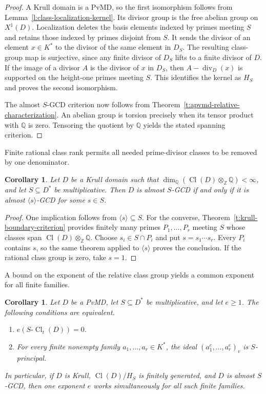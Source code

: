\documentclass[11pt]{amsart}
\newtheorem{corollary}[theorem]{Corollary}
\theoremstyle{definition}
\theoremstyle{remark}
\DeclareMathOperator{\Cl}{Cl}
\newcommand{\ZZ}{\mathbb Z}
\newcommand{\QQ}{\mathbb Q}
\begin{document}
\begin{proof}
A Krull domain is a PvMD, so the first isomorphism follows from
Lemma~\ref{l:class-localization-kernel}. Its divisor group is the
free abelian group on $X^1(D)$. Localization deletes the basis
elements indexed by primes meeting $S$ and retains those indexed
by primes disjoint from $S$. It sends the divisor of an element
$x\in K^\ast$ to the divisor of the same element in $D_S$.
The resulting class-group map is surjective, since any finite
divisor of $D_S$ lifts to a finite divisor of $D$.
If the image of a divisor $A$ is the divisor of $x$ in $D_S$,
then $A-\operatorname{div}_D(x)$ is supported on the height-one
primes meeting $S$. This identifies the kernel as $H_S$ and
proves the second isomorphism.

The almost $S$-GCD criterion now follows from
Theorem~\ref{t:apvmd-relative-characterization}.
An abelian group is torsion precisely when its tensor product
with $\QQ$ is zero. Tensoring the quotient by $\QQ$ yields the
stated spanning criterion.
\end{proof}

Finite rational class rank permits all needed prime-divisor classes
to be removed by one denominator.

\begin{corollary}\label{c:one-denominator-finite-rank}
Let $D$ be a Krull domain such that
$\dim_{\QQ}(\Cl(D)\otimes_{\ZZ}\QQ)<\infty$, and let
$S\subseteq D^\ast$ be multiplicative. Then $D$ is almost
$S$-GCD if and only if it is almost $\langle s\rangle$-GCD
for some $s\in S$.
\end{corollary}

\begin{proof}
One implication follows from $\langle s\rangle\subseteq S$.
For the converse, Theorem~\ref{t:krull-boundary-criterion}
provides finitely many primes $P_1,\ldots,P_r$ meeting $S$
whose classes span $\Cl(D)\otimes_{\ZZ}\QQ$.
Choose $s_i\in S\cap P_i$ and put $s=s_1\cdots s_r$.
Every $P_i$ contains $s$, so the same theorem applied to
$\langle s\rangle$ proves the conclusion.
If the rational class group is zero, take $s=1$.
\end{proof}

A bound on the exponent of the relative class group yields a
common exponent for all finite families.

\begin{corollary}\label{c:uniform-class-exponent}
Let $D$ be a PvMD, let $S\subseteq D^\ast$ be multiplicative,
and let $e\geq1$. The following conditions are equivalent.
\begin{enumerate}
\item $e(S\text{-}\Cl_t(D))=0$.
\item For every finite nonempty family $a_1,\ldots,a_r\in K^\ast$,
the ideal $(a_1^e,\ldots,a_r^e)_v$ is $S$-principal.
\end{enumerate}
In particular, if $D$ is Krull, $\Cl(D)/H_S$ is finitely
generated, and $D$ is almost $S$-GCD, then one exponent $e$
works simultaneously for all such finite families.
\end{corollary}
\end{document}
